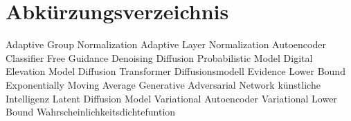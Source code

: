 \chapter*{Abkürzungsverzeichnis}

\begin{acronym}[AdaGN]
        {Adaptive Group Normalization}
        {Adaptive Layer Normalization}
           {Autoencoder}
          {Classifier Free Guidance}
         {Denoising Diffusion Probabilistic Model}
          {Digital Elevation Model}
          {Diffusion Transformer}
           {Diffusionsmodell}
         {Evidence Lower Bound}
          {Exponentially Moving Average}
          {Generative Adversarial Network}
           {künstliche Intelligenz}
          {Latent Diffusion Model}
          {Variational Autoencoder}
          {Variational Lower Bound}
          {Wahrscheinlichkeitsdichtefuntion}
\end{acronym}